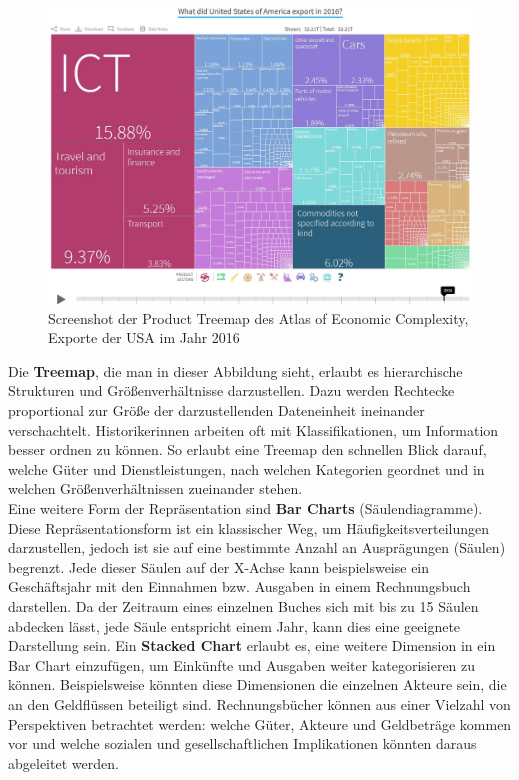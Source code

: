 \documentclass[12pt,a4paper]{article}
\begin{document}
\begin{figure}[H]
\centering
	\includegraphics[width=1\textwidth]{img/atlas.jpg}  
    \caption[Screenshot der Product Treemap des Atlas of Economic Complexity, Exporte der USA im Jahr 2016, atlas.cid.harvard.edu 09.12.2019.]{Screenshot der Product Treemap des Atlas of Economic Complexity, Exporte der USA im Jahr 2016} \label{fig:atlas}
\end{figure}
Die \textbf{Treemap}, die man in dieser Abbildung sieht, erlaubt es hierarchische Strukturen und Größenverhältnisse darzustellen. Dazu werden Rechtecke proportional zur Größe der darzustellenden Dateneinheit ineinander verschachtelt. Historikerinnen arbeiten oft mit Klassifikationen, um Information besser ordnen zu können. So erlaubt eine Treemap den schnellen Blick darauf, welche Güter und Dienstleistungen, nach welchen Kategorien geordnet und in welchen Größenverhältnissen zueinander stehen.
\\
Eine weitere Form der Repräsentation sind \textbf{Bar Charts} (Säulendiagramme). Diese Repräsentationsform ist ein klassischer Weg, um Häufigkeitsverteilungen darzustellen, jedoch ist sie auf eine bestimmte Anzahl an Ausprägungen (Säulen) begrenzt. Jede dieser Säulen auf der X-Achse kann beispielsweise ein Geschäftsjahr mit den Einnahmen bzw. Ausgaben in einem Rechnungsbuch darstellen. Da der Zeitraum eines einzelnen Buches sich mit bis zu 15 Säulen abdecken lässt, jede Säule entspricht einem Jahr, kann dies eine geeignete Darstellung sein. Ein \textbf{Stacked Chart} erlaubt es, eine weitere Dimension in ein Bar Chart einzufügen, um Einkünfte und Ausgaben weiter kategorisieren zu können. Beispielsweise könnten diese Dimensionen die einzelnen Akteure sein, die an den Geldflüssen beteiligt sind. Rechnungsbücher können aus einer Vielzahl von Perspektiven betrachtet werden: welche Güter, Akteure und Geldbeträge kommen vor und welche sozialen und gesellschaftlichen Implikationen könnten daraus abgeleitet werden.
\end{document}
